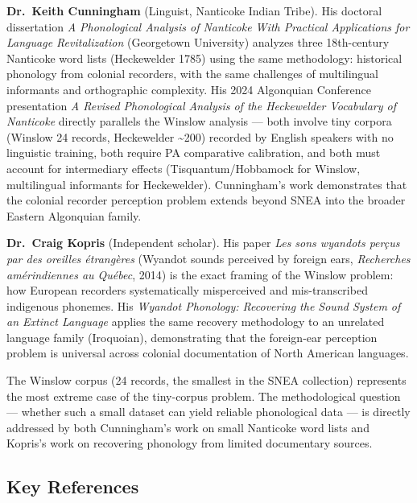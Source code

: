 \textbf{Dr.\ Keith Cunningham} (Linguist, Nanticoke Indian Tribe). His doctoral
dissertation \emph{A Phonological Analysis of Nanticoke With Practical
Applications for Language Revitalization} (Georgetown University) analyzes three
18th-century Nanticoke word lists (Heckewelder 1785) using the same methodology:
historical phonology from colonial recorders, with the same challenges of
multilingual informants and orthographic complexity. His 2024 Algonquian
Conference presentation \emph{A Revised Phonological Analysis of the Heckewelder
Vocabulary of Nanticoke} directly parallels the Winslow analysis --- both
involve tiny corpora (Winslow 24 records, Heckewelder \textasciitilde200)
recorded by English speakers with no linguistic training, both require PA
comparative calibration, and both must account for intermediary effects
(Tisquantum/Hobbamock for Winslow, multilingual informants for Heckewelder).
Cunningham's work demonstrates that the colonial recorder perception problem
extends beyond SNEA into the broader Eastern Algonquian family.

\textbf{Dr.\ Craig Kopris} (Independent scholar). His paper \emph{Les sons
wyandots perçus par des oreilles étrangères} (Wyandot sounds perceived by
foreign ears, \emph{Recherches amérindiennes au Québec}, 2014) is the exact
framing of the Winslow problem: how European recorders systematically
misperceived and mis-transcribed indigenous phonemes. His \emph{Wyandot
Phonology: Recovering the Sound System of an Extinct Language} applies the same
recovery methodology to an unrelated language family (Iroquoian), demonstrating
that the foreign-ear perception problem is universal across colonial
documentation of North American languages.

The Winslow corpus (24 records, the smallest in the SNEA collection) represents
the most extreme case of the tiny-corpus problem. The methodological question
--- whether such a small dataset can yield reliable phonological data --- is
directly addressed by both Cunningham's work on small Nanticoke word lists and
Kopris's work on recovering phonology from limited documentary sources.

\subsection{Key References}

